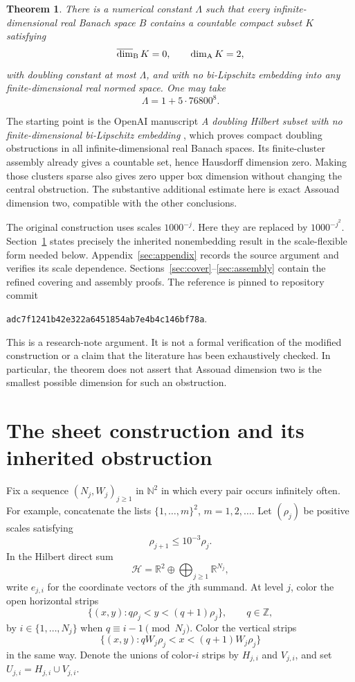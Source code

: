 \documentclass[
  11pt,
]{article}
\newtheorem{theorem}{Theorem}[section]
\theoremstyle{remark}\newtheorem{remark}[theorem]{Remark}
\newcommand{\R}{\mathbb R}\newcommand{\N}{\mathbb N}\newcommand{\Z}{\mathbb Z}
\newcommand{\dimB}{\mathop{\overline{\dim}}\nolimits_{\mathrm B}}
\begin{document}
\begin{theorem}\label{thm:main}
There is a numerical constant $\Lambda$ such that every infinite-dimensional real Banach space $B$ contains a countable compact subset $K$ satisfying
\[
 \dimB K=0,\qquad \dimA K=2,
\]
with doubling constant at most $\Lambda$, and with no bi-Lipschitz embedding into any finite-dimensional real normed space. One may take
\[
 \Lambda=1+5\cdot 76800^8.
\]
\end{theorem}

The starting point is the OpenAI manuscript \emph{A doubling Hilbert subset with no finite-dimensional bi-Lipschitz embedding} \cite{OpenAI}, which proves compact doubling obstructions in all infinite-dimensional real Banach spaces. Its finite-cluster assembly already gives a countable set, hence Hausdorff dimension zero. Making those clusters sparse also gives zero upper box dimension without changing the central obstruction. The substantive additional estimate here is exact Assouad dimension two, compatible with the other conclusions.

The original construction uses scales $1000^{-j}$. Here they are replaced by $1000^{-j^2}$. Section~\ref{sec:source} states precisely the inherited nonembedding result in the scale-flexible form needed below. Appendix~\ref{sec:appendix} records the source argument and verifies its scale dependence. Sections~\ref{sec:cover}--\ref{sec:assembly} contain the refined covering and assembly proofs. The reference is pinned to repository commit
\begin{center}
\texttt{adc7f1241b42e322a6451854ab7e4b4c146bf78a}.
\end{center}
This is a research-note argument. It is not a formal verification of the modified construction or a claim that the literature has been exhaustively checked. In particular, the theorem does not assert that Assouad dimension two is the smallest possible dimension for such an obstruction.

\section{The sheet construction and its inherited obstruction}\label{sec:source}
Fix a sequence $(N_j,W_j)_{j\ge1}$ in $\N^2$ in which every pair occurs infinitely often. For example, concatenate the lists $\{1,\ldots,m\}^2$, $m=1,2,\ldots$. Let $(\rho_j)$ be positive scales satisfying
\begin{equation}\label{eq:scale-general}
 \rho_{j+1}\le 10^{-3}\rho_j.
\end{equation}
In the Hilbert direct sum
\[
 \mathcal H=\R^2\oplus\bigoplus_{j\ge1}\R^{N_j},
\]
write $e_{j,i}$ for the coordinate vectors of the $j$th summand. At level $j$, color the open horizontal strips
\[
 \{(x,y):q\rho_j<y<(q+1)\rho_j\},\qquad q\in\Z,
\]
by $i\in\{1,\ldots,N_j\}$ when $q\equiv i-1\pmod{N_j}$. Color the vertical strips
\[
 \{(x,y):qW_j\rho_j<x<(q+1)W_j\rho_j\}
\]
in the same way. Denote the unions of color-$i$ strips by $H_{j,i}$ and $V_{j,i}$, and set $U_{j,i}=H_{j,i}\cup V_{j,i}$.
\end{document}
